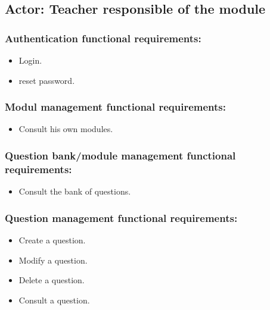 \documentclass[a4paper,12p]{article}
\begin{document}
     \subsection{Actor: Teacher responsible of the module}
     \begin{itemize}
        \subsubsection{Authentication functional requirements:}
        \begin{itemize}
            \item Login.
            \item reset password.
        \end{itemize}

        \subsubsection{Modul management functional requirements:}
        \begin{itemize}
            \item Consult his own modules.
        \end{itemize}

        \subsubsection{Question bank/module management functional requirements:}
        \begin{itemize}
            \item Consult the bank of questions.
        \end{itemize}

        \subsubsection{Question management functional requirements:}
        \begin{itemize}
            \item Create a question.
            \item Modify a question.
            \item Delete a question.
            \item Consult a question.
        \end{itemize}


\end{itemize}
\end{document}
